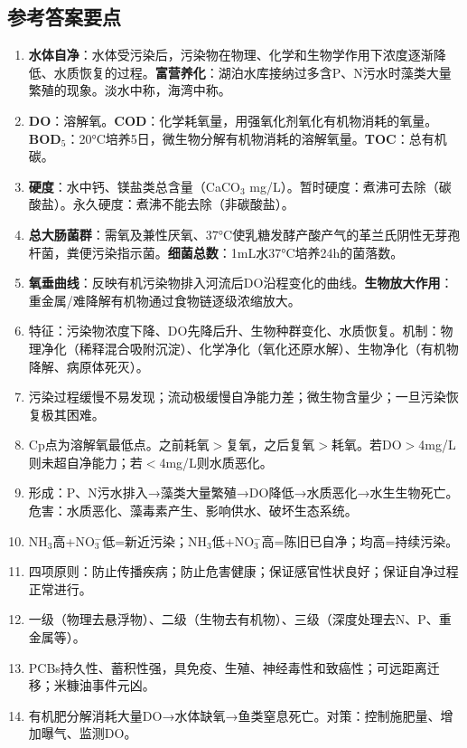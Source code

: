 \documentclass[10pt,a4paper,oneside]{ctexbook}
\begin{document}
\subsection*{参考答案要点}

\begin{enumerate}[leftmargin=*, itemsep=5pt]
    \item \textbf{水体自净}：水体受污染后，污染物在物理、化学和生物学作用下浓度逐渐降低、水质恢复的过程。\textbf{富营养化}：湖泊水库接纳过多含P、N污水时藻类大量繁殖的现象。淡水中称，海湾中称。

    \item \textbf{DO}：溶解氧。\textbf{COD}：化学耗氧量，用强氧化剂氧化有机物消耗的氧量。\textbf{BOD$_5$}：20°C培养5日，微生物分解有机物消耗的溶解氧量。\textbf{TOC}：总有机碳。

    \item \textbf{硬度}：水中钙、镁盐类总含量（CaCO$_3$ mg/L）。暂时硬度：煮沸可去除（碳酸盐）。永久硬度：煮沸不能去除（非碳酸盐）。

    \item \textbf{总大肠菌群}：需氧及兼性厌氧、37°C使乳糖发酵产酸产气的革兰氏阴性无芽孢杆菌，粪便污染指示菌。\textbf{细菌总数}：1mL水37°C培养24h的菌落数。

    \item \textbf{氧垂曲线}：反映有机污染物排入河流后DO沿程变化的曲线。\textbf{生物放大作用}：重金属/难降解有机物通过食物链逐级浓缩放大。

    \item 特征：污染物浓度下降、DO先降后升、生物种群变化、水质恢复。机制：物理净化（稀释混合吸附沉淀）、化学净化（氧化还原水解）、生物净化（有机物降解、病原体死灭）。

    \item 污染过程缓慢不易发现；流动极缓慢自净能力差；微生物含量少；一旦污染恢复极其困难。

    \item Cp点为溶解氧最低点。之前耗氧$>$复氧，之后复氧$>$耗氧。若DO$>$4mg/L则未超自净能力；若$<$4mg/L则水质恶化。

    \item 形成：P、N污水排入→藻类大量繁殖→DO降低→水质恶化→水生生物死亡。危害：水质恶化、藻毒素产生、影响供水、破坏生态系统。

    \item NH$_3$高+NO$_3^-$低=新近污染；NH$_3$低+NO$_3^-$高=陈旧已自净；均高=持续污染。

    \item 四项原则：防止传播疾病；防止危害健康；保证感官性状良好；保证自净过程正常进行。

    \item 一级（物理去悬浮物）、二级（生物去有机物）、三级（深度处理去N、P、重金属等）。

    \item PCBs持久性、蓄积性强，具免疫、生殖、神经毒性和致癌性；可远距离迁移；米糠油事件元凶。

    \item 有机肥分解消耗大量DO→水体缺氧→鱼类窒息死亡。对策：控制施肥量、增加曝气、监测DO。
\end{enumerate}
\end{document}
